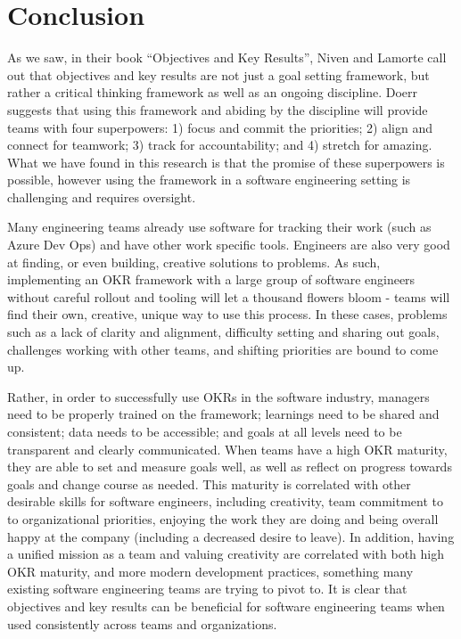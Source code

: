 \documentclass[sigconf, nonacm]{acmart}
\begin{document}

\section{Conclusion}
As we saw, in their book ``Objectives and Key Results'', Niven and Lamorte call out that objectives and key results are not just a goal setting framework, but rather a critical thinking framework as well as an ongoing discipline. Doerr suggests that using this framework and abiding by the discipline will provide teams with four superpowers: 1) focus and commit the priorities; 2) align and connect for teamwork; 3) track for accountability; and 4) stretch for amazing. What we have found in this research is that the promise of these superpowers is possible, however using the framework in a software engineering setting is challenging and requires oversight.

Many engineering teams already use software for tracking their work (such as Azure Dev Ops) and have other work specific tools. Engineers are also very good at finding, or even building, creative solutions to problems. As such, implementing an OKR framework with a large group of software engineers without careful rollout and tooling will let a thousand flowers bloom - teams will find their own, creative, unique way to use this process. In these cases, problems such as a lack of clarity and alignment, difficulty setting and sharing out goals, challenges working with other teams, and shifting priorities are bound to come up.

Rather, in order to successfully use OKRs in the software industry, managers need to be properly trained on the framework; learnings need to be shared and consistent; data needs to be accessible; and goals at all levels need to be transparent and clearly communicated. When teams have a high OKR maturity, they are able to set and measure goals well, as well as reflect on progress towards goals and change course as needed. This maturity is correlated with other desirable skills for software engineers, including creativity, team commitment to to organizational priorities, enjoying the work they are doing and being overall happy at the company (including a decreased desire to leave). In addition, having a unified mission as a team and valuing creativity are correlated with both high OKR maturity, and more modern development practices, something many existing software engineering teams are trying to pivot to. It is clear that objectives and key results can be beneficial for software engineering teams when used consistently across teams and organizations. 
\end{document}
